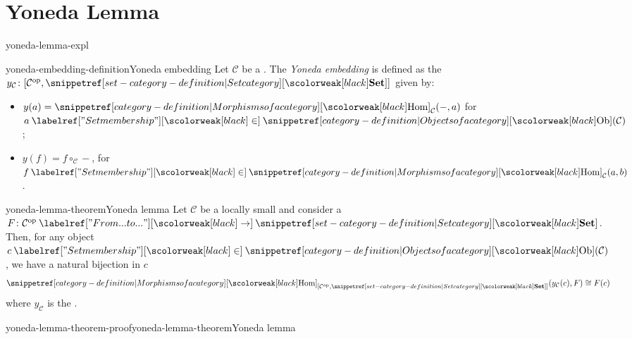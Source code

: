 \documentclass[preview]{standalone}
\begin{document}
\genpage

\section{Yoneda Lemma}

\begin{snippet}{yoneda-lemma-expl}
    \todo
\end{snippet}

\begin{snippetdefinition}{yoneda-embedding-definition}{Yoneda embedding}
    Let \(\mathcal{C}\) be a \category.
    The \emph{Yoneda embedding} is defined as the \functor
    \(y_\mathcal{C} \colon [\mathcal{C}^\text{op}, \catset]\) given by:
    \begin{itemize}
        \item \(y(a) = \cathom_\mathcal{C}(-, a)\) for \(a \in \catob(\mathcal{C})\);
        \item \(y(f) = f \circ_\mathcal{C} -\), for \(f \in \cathom_\mathcal{C}(a,b)\).
    \end{itemize}
\end{snippetdefinition}

\begin{snippettheorem}{yoneda-lemma-theorem}{Yoneda lemma}
    Let \(\mathcal{C}\) be a locally small \category
    and consider a \functor \(F \colon \mathcal{C}^\text{op} \fromto \catset\).
    Then, for any object \(c \in \catob(\mathcal{C})\), we have a natural
    bijection in \(c\)
    \[
        \cathom_{[{\mathcal{C}}^{\text{op}}, \catset]}(
            y_\mathcal{C}(c), F
        ) \cong F(c)
    \]
    where \(y_\mathcal{C}\) is the .
\end{snippettheorem}

\begin{snippetproof}{yoneda-lemma-theorem-proof}{yoneda-lemma-theorem}{Yoneda lemma}
    
\end{snippetproof}
\end{document}
